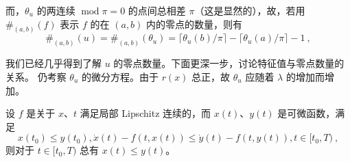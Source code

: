 而，$\theta_u$ 的两连续 $\operatorname{mod} \pi = 0$ 的点间总相差 $\pi$（这是显然的），故，若用 $\#_{(a, b)}(f)$ 表示 $f$ 的在 $(a, b)$ 内的零点的数量，则有
\begin{equation}
\#_{(a, b)} (u) = \#_{(a, b)} (\theta_u) = \lceil \theta_u(b)/\pi \rceil - \lceil \theta_u(a)/\pi \rceil -1~,
\end{equation}

我们已经几乎得到了解 $u$ 的零点数量。下面更深一步，讨论特征值与零点数量的关系。
仍考察 $\theta_u$ 的微分方程。由于 $r(x)$ 总正，故 $\theta_u$ 应随着 $\lambda$ 的增加而增加。
\begin{lemma}{}
设 $f$ 是关于 $x$、$t$ 满足局部 Lipschitz 连续的，而 $x(t)$、$y(t)$ 是可微函数，满足
\begin{equation}
x(t_0) \le y(t_0), \dot x(t)-f(t, x (t)) \le \dot y(t) - f(t, y(t)), t \in [t_0, T) ~,
\end{equation}
则对于 $t \in [t_0, T)$ 总有 $x(t) \le y(t)$。
\end{lemma}
